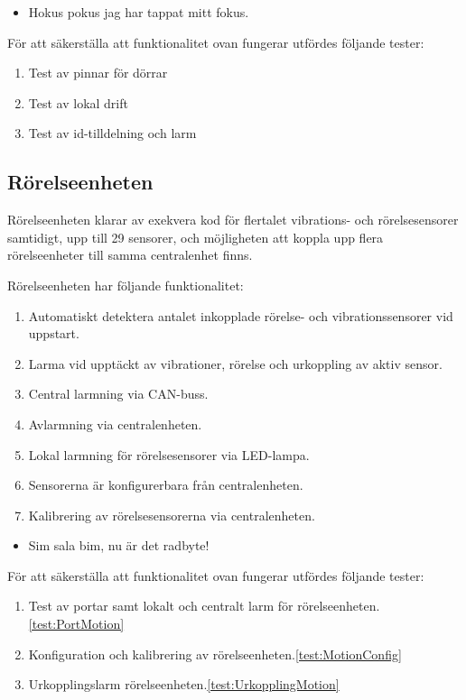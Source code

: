 \documentclass{article}
\begin{document}
 \begin{itemize}
\color{white}
\item Hokus pokus jag har tappat mitt fokus.
\end{itemize}
 
 För att säkerställa att funktionalitet ovan fungerar utfördes följande tester:
 \begin{enumerate}
     \item Test av pinnar för dörrar
     \item Test av lokal drift
     \item Test av id-tilldelning och larm
 \end{enumerate}

 \subsection{Rörelseenheten}
Rörelseenheten klarar av  exekvera kod för flertalet vibrations- och rörelsesensorer samtidigt, upp till 29 sensorer, 
och möjligheten att koppla upp flera rörelseenheter till samma centralenhet finns.

 Rörelseenheten har följande funktionalitet:
 \begin{enumerate}
 	\item Automatiskt detektera antalet inkopplade rörelse- och vibrationssensorer vid uppstart.
	\item Larma vid upptäckt av vibrationer, rörelse och urkoppling av aktiv sensor.
    	\item Central larmning via CAN-buss.
	\item Avlarmning via centralenheten.
	\item Lokal larmning för rörelsesensorer via LED-lampa.
	\item Sensorerna är konfigurerbara från centralenheten.
	\item Kalibrering av rörelsesensorerna via centralenheten.
 \end{enumerate}

 \begin{itemize}
\color{white}
\item Sim sala bim, nu är det radbyte!
\end{itemize}

 För att säkerställa att funktionalitet ovan fungerar utfördes följande tester:
 \begin{enumerate}
	\item Test av portar samt lokalt och centralt larm för rörelseenheten.\ref{test:PortMotion}
	\item Konfiguration och kalibrering av rörelseenheten.\ref{test:MotionConfig}
	\item Urkopplingslarm rörelseenheten.\ref{test:UrkopplingMotion}
 \end{enumerate}
 
\end{document}
